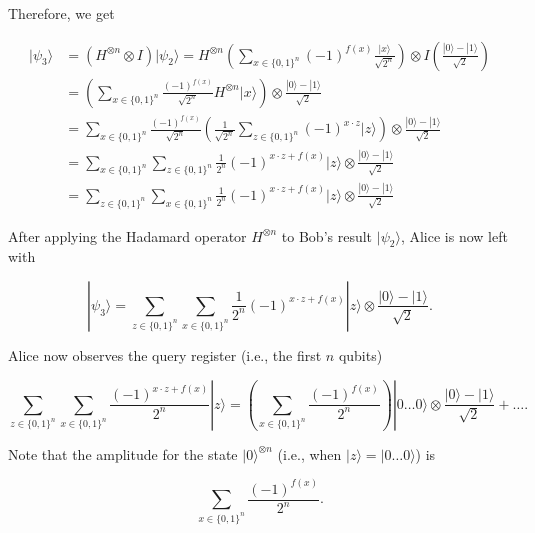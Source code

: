 \documentclass{article}
\theoremstyle{definition}
\begin{document}
\begin{enumerate}
      Therefore, we get 

      \begin{align*} 
        |\psi_3 \rangle & = (H^{\otimes n} \otimes I) |\psi_2 \rangle = H^{\otimes n} \left( \sum_{x \in \{0, 1\}^n} (-1)^{f(x)} \frac{|x\rangle}{\sqrt{2^n}} \right) \otimes I \left( \frac{|0\rangle - |1\rangle}{\sqrt{2}} \right)\\
        & = \left( \sum_{x \in \{0, 1\}^n} \frac{(-1)^{f(x)}}{\sqrt{2^n}} H^{\otimes n} |x\rangle \right) \otimes \frac{|0\rangle - |1\rangle}{\sqrt{2}} \\
        & = \sum_{x \in \{0, 1\}^n} \frac{(-1)^{f(x)}}{\sqrt{2^n}} \left( \frac{1}{\sqrt{2^n}} \sum_{z \in \{0, 1\}^n} (-1)^{x \cdot z} |z \rangle \right) \otimes \frac{|0\rangle - |1\rangle}{\sqrt{2}} \\
        & = \sum_{x \in \{0, 1\}^n} \sum_{z \in \{0, 1\}^n} \frac{1}{2^n} (-1)^{x \cdot z + f(x)} |z\rangle \otimes \frac{|0\rangle - |1\rangle}{\sqrt{2}} \\
        & = \sum_{z \in \{0, 1\}^n} \sum_{x \in \{0, 1\}^n} \frac{1}{2^n} (-1)^{x \cdot z + f(x)} |z\rangle \otimes \frac{|0\rangle - |1\rangle}{\sqrt{2}}
      \end{align*}
    \end{enumerate}

    After applying the Hadamard operator $H^{\otimes n}$ to Bob's result $|\psi_2 \rangle$, Alice is now left with 

      \[|\psi_3 \rangle = \sum_{z \in \{0, 1\}^n} \sum_{x \in \{0, 1\}^n} \frac{1}{2^n} (-1)^{x \cdot z + f(x)} |z\rangle \otimes \frac{|0\rangle - |1\rangle}{\sqrt{2}}. \]

    Alice now observes the query register (i.e., the first $n$ qubits)

      \[\sum_{z \in \{0, 1\}^n} \sum_{x \in \{0, 1\}^n} \frac{(-1)^{x \cdot z + f(x)}}{2^n} |z\rangle = \left( \sum_{x \in \{0, 1\}^n} \frac{(-1)^{f(x)}}{2^n}\right) |0\ldots 0 \rangle \otimes \frac{|0\rangle - |1\rangle}{\sqrt{2}} + \ldots. \]

    Note that the amplitude for the state $|0\rangle^{\otimes n}$ (i.e., when $|z\rangle = |0 \ldots 0\rangle$) is 

      \[\sum_{x \in \{0, 1\}^n} \frac{(-1)^{f(x)}}{2^n}.\]
\end{document}
